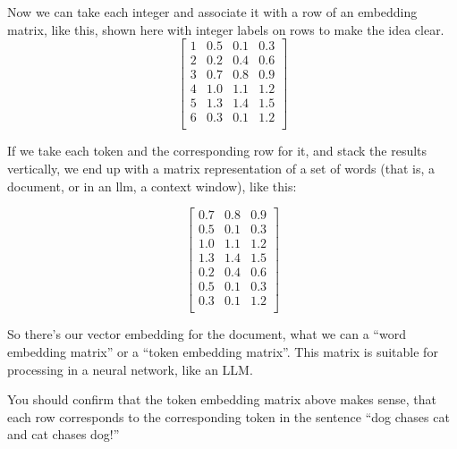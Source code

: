 Now we can take each integer and associate it with a row of an embedding matrix, like this, shown here with integer labels on rows to make the idea clear.
\[
\left[\begin{array}{c|ccc}
    1 & 0.5 & 0.1 & 0.3 \\
    2 & 0.2 & 0.4 & 0.6 \\
    3 & 0.7 & 0.8 & 0.9 \\
    4 & 1.0 & 1.1 & 1.2 \\
    5 & 1.3 & 1.4 & 1.5 \\
    6 & 0.3 & 0.1 & 1.2 \\
\end{array}\right]
\]

If we take each token and the corresponding row for it, and stack the results vertically, we end up with a matrix representation of a set of words (that is, a document, or in an llm, a context window), like this: 

\[
\begin{bmatrix}
    0.7 & 0.8 & 0.9 \\
    0.5 & 0.1 & 0.3 \\
    1.0 & 1.1 & 1.2 \\
    1.3 & 1.4 & 1.5 \\
    0.2 & 0.4 & 0.6 \\
    0.5 & 0.1 & 0.3 \\
    0.3 & 0.1 & 1.2 \\
\end{bmatrix}
\]

So there's our vector embedding for the document,  what we can a ``word embedding matrix'' or a ``token embedding matrix''. This matrix is suitable for processing in a neural network, like an LLM. 

You should confirm that the token embedding matrix above makes sense, that each row corresponds to the corresponding token in the sentence ``dog chases cat and cat chases dog!''